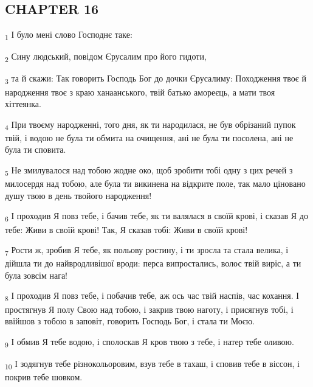 \subsection{CHAPTER 16}
\begin{tcolorbox}
\textsubscript{1} І було мені слово Господнє таке:
\end{tcolorbox}
\begin{tcolorbox}
\textsubscript{2} Сину людський, повідом Єрусалим про його гидоти,
\end{tcolorbox}
\begin{tcolorbox}
\textsubscript{3} та й скажи: Так говорить Господь Бог до дочки Єрусалиму: Походження твоє й народження твоє з краю ханаанського, твій батько амореєць, а мати твоя хіттеянка.
\end{tcolorbox}
\begin{tcolorbox}
\textsubscript{4} При твоєму народженні, того дня, як ти народилася, не був обрізаний пупок твій, і водою не була ти обмита на очищення, ані не була ти посолена, ані не була ти сповита.
\end{tcolorbox}
\begin{tcolorbox}
\textsubscript{5} Не змилувалося над тобою жодне око, щоб зробити тобі одну з цих речей з милосердя над тобою, але була ти викинена на відкрите поле, так мало ціновано душу твою в день твойого народження!
\end{tcolorbox}
\begin{tcolorbox}
\textsubscript{6} І проходив Я повз тебе, і бачив тебе, як ти валялася в своїй крові, і сказав Я до тебе: Живи в своїй крові! Так, Я сказав тобі: Живи в своїй крові!
\end{tcolorbox}
\begin{tcolorbox}
\textsubscript{7} Рости ж, зробив Я тебе, як польову ростину, і ти зросла та стала велика, і дійшла ти до найвродливішої вроди: перса випростались, волос твій виріс, а ти була зовсім нага!
\end{tcolorbox}
\begin{tcolorbox}
\textsubscript{8} І проходив Я повз тебе, і побачив тебе, аж ось час твій наспів, час кохання. І простягнув Я полу Свою над тобою, і закрив твою наготу, і присягнув тобі, і ввійшов з тобою в заповіт, говорить Господь Бог, і стала ти Моєю.
\end{tcolorbox}
\begin{tcolorbox}
\textsubscript{9} І обмив Я тебе водою, і сполоскав Я кров твою з тебе, і натер тебе оливою.
\end{tcolorbox}
\begin{tcolorbox}
\textsubscript{10} І зодягнув тебе різнокольоровим, взув тебе в тахаш, і сповив тебе в віссон, і покрив тебе шовком.
\end{tcolorbox}

